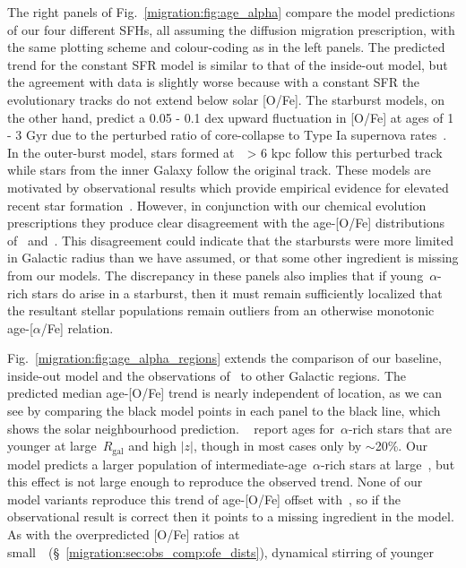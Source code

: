 The right panels of Fig.~\ref{migration:fig:age_alpha} compare the model predictions of 
our four different SFHs, all assuming the diffusion migration prescription, 
with the same plotting scheme and colour-coding as in the left panels. 
The predicted trend for the constant SFR model is similar to that of the 
inside-out model, but the agreement with data is slightly worse because with a 
constant SFR the evolutionary tracks do not extend below solar [O/Fe]. 
The starburst models, on the other hand, predict a 0.05 - 0.1 dex upward 
fluctuation in [O/Fe] at ages of 1 - 3 Gyr due to the perturbed ratio of 
core-collapse to Type Ia supernova rates~\citep{Johnson2020}. 
In the outer-burst model, stars formed at~\rgal~> 6 kpc follow this perturbed 
track while stars from the inner Galaxy follow the original track. 
These models are motivated by observational results which provide empirical 
evidence for elevated recent star formation~\citep{Mor2019, Isern2019}. 
However, in conjunction with our chemical evolution prescriptions they produce 
clear disagreement with the age-[O/Fe] distributions of~\citet{Feuillet2019} 
and~\citet{Miglio2021}. 
This disagreement could indicate that the starbursts were more limited in 
Galactic radius than we have assumed, or that some other ingredient is missing 
from our models. 
The discrepancy in these panels also implies that if young~$\alpha$-rich stars 
do arise in a starburst, then it must remain sufficiently localized that the 
resultant stellar populations remain outliers from an otherwise monotonic 
age-[$\alpha$/Fe] relation. 
\par 
Fig.~\ref{migration:fig:age_alpha_regions} extends the comparison of our baseline, 
inside-out model and the observations of~\citet{Feuillet2019} to other 
Galactic regions. 
The predicted median age-[O/Fe] trend is nearly independent of location, as we 
can see by comparing the black model points in each panel to the black line, 
which shows the solar neighbourhood prediction. 
~\citet{Feuillet2019} report ages for~$\alpha$-rich stars that are younger at 
large~$R_\text{gal}$ and high $\left|z\right|$, though in most cases only by 
$\sim$20\%. 
Our model predicts a larger population of intermediate-age~$\alpha$-rich stars 
at large~\rgal, but this effect is not large enough to reproduce the observed 
trend. 
None of our model variants reproduce this trend of age-[O/Fe] offset with~\absz, 
so if the observational result is correct then it points to a missing 
ingredient in the model. 
As with the overpredicted [O/Fe] ratios at 
small~\rgal~(\S~\ref{migration:sec:obs_comp:ofe_dists}), dynamical stirring of younger 
